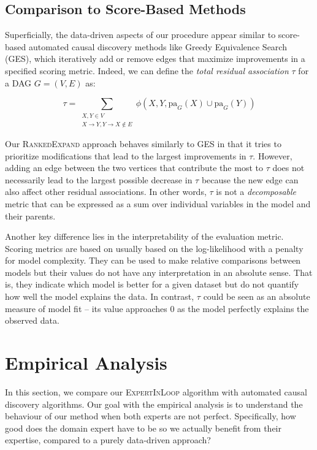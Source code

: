 \documentclass[accepted]{uai2025} %
\begin{document}
\subsection{Comparison to Score-Based Methods}

Superficially, the data-driven aspects of our procedure appear
 similar to score-based automated causal discovery methods like 
Greedy Equivalence Search (GES), which 
iteratively add or remove edges that maximize improvements in a specified
scoring metric. Indeed, we can define the \emph{total residual association}
 $ \tau $ for a DAG $ G = (V, E) $ as:

\begin{equation}
	\tau = \sum_{\substack{X, Y \in V \\ X \rightarrow Y, Y \rightarrow X \not \in E}}   \phi(X, Y, \mathrm{pa}_G(X) \cup \mathrm{pa}_G(Y))
\label{eqn:tau}
\end{equation}

Our \textsc{RankedExpand} approach behaves similarly to GES in that it 
tries to prioritize modifications that lead to the largest improvements 
in $\tau$. However, adding an edge between the two vertices that contribute
the most to $\tau$ does not necessarily lead to the largest 
possible decrease in $\tau$ because the new edge can also affect other 
residual associations. In other words, $\tau$ is not a \emph{decomposable}
metric that can be expressed as a sum over individual variables in the model
and their parents. 

Another key difference lies in the interpretability of the evaluation metric.
Scoring metrics are based on usually based on the log-likelihood with a penalty
for model complexity. They can be used to make relative comparisons between
models but their values do not have any interpretation in an absolute sense.
That is, they indicate which model is better for a given dataset but do not
quantify how well the model explains the data. In
contrast, $ \tau $ could be seen as an absolute measure of model fit -- 
its value approaches $ 0 $ as the model perfectly explains the observed data.

\section{Empirical Analysis}
\label{sec:empirical}

In this section, we compare our \textsc{ExpertInLoop} algorithm with automated
causal discovery algorithms. Our goal with the empirical analysis is to
understand the behaviour of our method when both experts are not perfect.
Specifically, how good does the domain expert have to be so we actually benefit
from their expertise, compared to a purely data-driven approach? 
\end{document}
